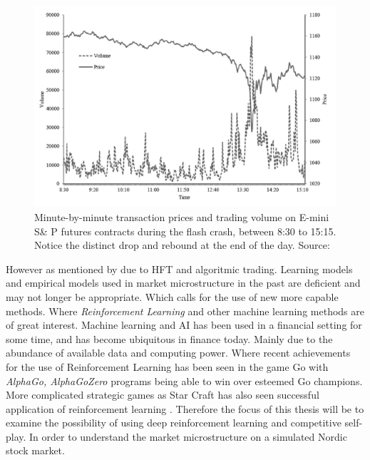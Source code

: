 \documentclass{kththesis}
\theoremstyle{definition}
\begin{document}
\begin{figure}[ht]
    \centering
    \includegraphics[scale=.7]{flashcrash.PNG}
    \caption{Minute-by-minute transaction prices and trading volume on E-mini S\& P futures contracts during the flash crash, between 8:30 to 15:15. Notice the distinct drop and rebound at the end of the day. Source: \textcite{kirilenko2017flash} }
    \label{fig:1}
\end{figure}

However as mentioned by \textcite{o2015high} due to HFT and algoritmic trading. Learning models and empirical models used in market microstructure in the past are deficient and may not longer be appropriate. Which calls for the use of new more capable methods. Where \textit{Reinforcement Learning} and other machine learning methods are of great interest. Machine learning and AI has been used in a financial setting for some time, and has become ubiquitous in finance today. Mainly due to the abundance of available data and computing power. 
\newline
\newline
Where recent achievements for the use of Reinforcement Learning has been seen in the game Go with \textit{AlphaGo, AlphaGoZero} \parencite{silver2016mastering} programs being able to win over esteemed Go champions. More complicated strategic games as Star Craft has also seen successful application of reinforcement learning \parencite{vinyals2017starcraft}. Therefore the focus of this thesis will be to examine the possibility of using deep reinforcement learning and competitive self-play. In order to understand the market microstructure on a simulated Nordic stock market.

\end{document}
